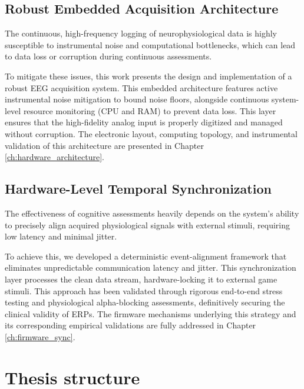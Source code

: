 \subsection{Robust Embedded Acquisition Architecture}

The continuous, high-frequency logging of neurophysiological data is highly susceptible to instrumental noise and computational bottlenecks, which can lead to data loss or corruption during continuous assessments.

To mitigate these issues, this work presents the design and implementation of a robust \gls{EEG} acquisition system. This embedded architecture features active instrumental noise mitigation to bound noise floors, alongside continuous system-level resource monitoring (CPU and RAM) to prevent data loss. This layer ensures that the high-fidelity analog input is properly digitized and managed without corruption. The electronic layout, computing topology, and instrumental validation of this architecture are presented in Chapter \ref{ch:hardware_architecture}.

\subsection{Hardware-Level Temporal Synchronization}

The effectiveness of cognitive assessments heavily depends on the system's ability to precisely align acquired physiological signals with external stimuli, requiring low latency and minimal jitter.

To achieve this, we developed a deterministic event-alignment framework that eliminates unpredictable communication latency and jitter. This synchronization layer processes the clean data stream, hardware-locking it to external game stimuli. This approach has been validated through rigorous end-to-end stress testing and physiological alpha-blocking assessments, definitively securing the clinical validity of \glspl{ERP}. The firmware mechanisms underlying this strategy and its corresponding empirical validations are fully addressed in Chapter \ref{ch:firmware_sync}.

\section{Thesis structure}
\label{sec:thesis_structure}

